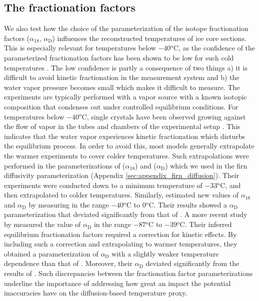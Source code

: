 \documentclass[11pt, draftcls, onecolumn]{IEEEtran} %
\numberwithin{equation}{section}
\numberwithin{table}{section}
\numberwithin{figure}{section}
\begin{document}
\subsection{The fractionation factors} \label{sec:results_fractionation}
We also test how the choice of the parameterization of the isotope fractionation factors ($\alpha_{18}$, $\alpha_\mathrm{D}$) 
influences the reconstructed temperatures of ice core sections. 
This is especially relevant for temperatures below $-40\mathrm{^oC}$, as the confidence of the 
parameterized fractionation factors has been shown to be low for such cold temperatures \citep{Ellehoj2013}. 
The low confidence is partly a consequence of two things a) it is difficult to avoid kinetic fractionation 
in the measurement system and b) the water vapor pressure becomes small which makes it difficult to measure.
The experiments are typically performed with a vapor source with a known isotopic composition 
that condenses out under controlled equilibrium conditions.
For temperatures below $-40\mathrm{^oC}$, single crystals have been observed growing against the flow of vapor
in the tubes and chambers of the experimental setup \citep{Ellehoj2013}.
This indicates that the water vapor experiences kinetic fractionation which disturbs the equilibrium process.
In order to avoid this, most models generally extrapolate the warmer experiments to cover colder temperatures.
Such extrapolations were performed in the parameterizations of \cite{Majoube1971} ($\alpha_{18}$) and \cite{Merlivat1967} ($\alpha_\mathrm{D}$) 
which we used in the firn diffusivity parameterization (Appendix \ref{sec:appendix_firn_diffusion}).
Their experiments were conducted down to a minimum temperature of $-33\mathrm{^oC}$, and then extrapolated to colder temperatures.
Similarly, \cite{Ellehoj2013} estimated new values of $\alpha_{18}$ and $\alpha_\mathrm{D}$
by measuring in the range $-40\mathrm{^oC}$ to $0\mathrm{^oC}$. 
Their results showed a $\alpha_\mathrm{D}$ parameterization that deviated significantly from that of \cite{Merlivat1967}.
A more recent study by \cite{Lamb2015} measured the value of $\alpha_\mathrm{D}$ in the range $-87\mathrm{^oC}$ to $-39\mathrm{^oC}$. 
Their inferred equilibrium fractionation factors required a correction for kinetic effects. 
By including such a correction and extrapolating to warmer temperatures,
they obtained a parameterization of $\alpha_\mathrm{D}$ with a slightly weaker temperature dependence than that of \cite{Merlivat1967}.
Moreover, their $\alpha_\mathrm{D}$ deviated significantly from the results of \cite{Ellehoj2013}.
Such discrepancies between the fractionation factor parameterizations underline the importance of addressing 
how great an impact the potential inaccuracies have on the diffusion-based temperature proxy.
\end{document}
